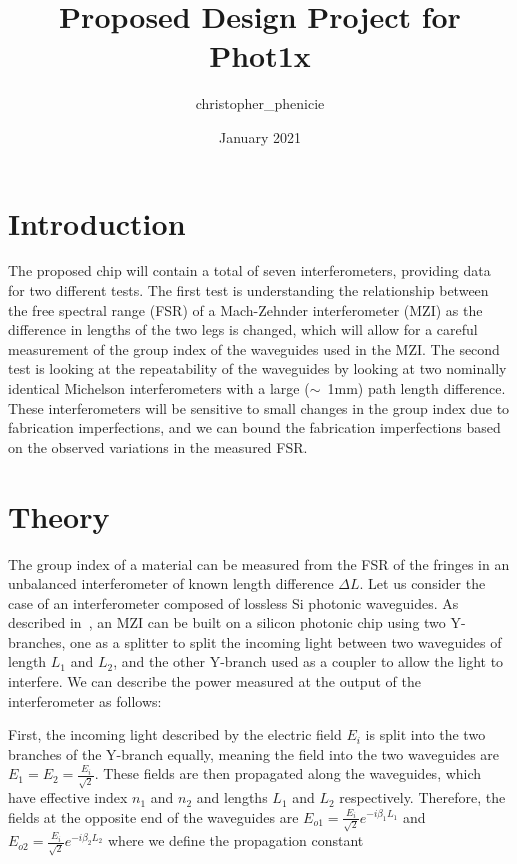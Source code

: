 \documentclass[journal]{IEEEtran}
\title{Proposed Design Project for Phot1x}
\date{January 2021}
\author{christopher\_phenicie}
\begin{document}
\maketitle

\section{Introduction}
\label{sec:intro}

The proposed chip will contain a total of seven interferometers, providing data for two different tests. The first test is understanding the relationship between the free spectral range (FSR) of a Mach-Zehnder interferometer (MZI) as the difference in lengths of the two legs is changed, which will allow for a careful measurement of the group index of the waveguides used in the MZI. The second test is looking at the repeatability of the waveguides by looking at two nominally identical Michelson interferometers with a large ($\sim$~1mm) path length difference. These interferometers will be sensitive to small changes in the group index due to fabrication imperfections, and we can bound the fabrication imperfections based on the observed variations in the measured FSR.

\section{Theory}
\label{sec:theory}

The group index of a material can be measured from the FSR of the fringes in an unbalanced interferometer of known length difference $\Delta L$. Let us consider the case of an interferometer composed of lossless Si photonic waveguides. As described in~\cite{Chrostowski2015}, an MZI can be built on a silicon photonic chip using two Y-branches, one as a splitter to split the incoming light between two waveguides of length $L_1$ and $L_2$, and the other Y-branch used as a coupler to allow the light to interfere. We can describe the power measured at the output of the interferometer as follows:

First, the incoming light described by the electric field $E_i$ is split into the two branches of the Y-branch equally, meaning the field into the two waveguides are $E_1 = E_2 = \frac{E_i}{\sqrt{2}}$. These fields are then propagated along the waveguides, which have effective index $n_1$ and $n_2$ and lengths $L_1$ and $L_2$ respectively. Therefore, the fields at the opposite end of the waveguides are $E_{o1} = \frac{E_i}{\sqrt{2}} e^{-i \beta_1 L_1}$ and $E_{o2} = \frac{E_i}{\sqrt{2}} e^{-i \beta_2 L_2}$ where we define the propagation constant 
\end{document}
